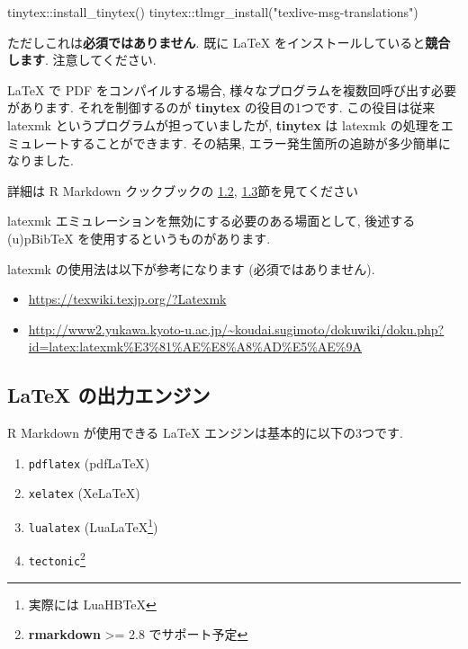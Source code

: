 \documentclass[
]{ltjsarticle}
\newenvironment{Shaded}{\begin{snugshade}}{\end{snugshade}}
\newcommand{\FunctionTok}[1]{\textcolor[rgb]{0.00,0.00,0.00}{#1}}
\newcommand{\NormalTok}[1]{#1}
\newcommand{\SpecialCharTok}[1]{\textcolor[rgb]{0.00,0.00,0.00}{#1}}
\newcommand{\StringTok}[1]{\textcolor[rgb]{0.31,0.60,0.02}{#1}}
\providecommand{\tightlist}{%
  \setlength{\itemsep}{0pt}\setlength{\parskip}{0pt}}
\begin{document}
\begin{Shaded}
\begin{Highlighting}[numbers=left,,]
\NormalTok{tinytex}\SpecialCharTok{::}\FunctionTok{install\_tinytex}\NormalTok{()}
\NormalTok{tinytex}\SpecialCharTok{::}\FunctionTok{tlmgr\_install}\NormalTok{(}\StringTok{"texlive{-}msg{-}translations"}\NormalTok{)}
\end{Highlighting}
\end{Shaded}

ただしこれは\textbf{必須ではありません}. 既に LaTeX をインストールしていると\textbf{競合します}. 注意してください.

LaTeX で PDF をコンパイルする場合, 様々なプログラムを複数回呼び出す必要があります. それを制御するのが \textbf{tinytex} の役目の1つです. この役目は従来 latexmk というプログラムが担っていましたが, \textbf{tinytex} は latexmk の処理をエミュレートすることができます. その結果, エラー発生箇所の追跡が多少簡単になりました.

詳細は R Markdown クックブックの \href{https://gedevan-aleksizde.github.io/rmarkdown-cookbook/install-latex.html}{1.2}, \href{https://gedevan-aleksizde.github.io/rmarkdown-cookbook/install-latex-pkgs.html}{1.3}節を見てください

latexmk エミュレーションを無効にする必要のある場面として, 後述する (u)pBibTeX を使用するというものがあります.

latexmk の使用法は以下が参考になります (必須ではありません).

\begin{itemize}
\tightlist
\item
  \url{https://texwiki.texjp.org/?Latexmk}
\item
  \url{http://www2.yukawa.kyoto-u.ac.jp/~koudai.sugimoto/dokuwiki/doku.php?id=latex:latexmk\%E3\%81\%AE\%E8\%A8\%AD\%E5\%AE\%9A}
\end{itemize}

\hypertarget{latex-ux306eux51faux529bux30a8ux30f3ux30b8ux30f3}{%
\subsection{LaTeX の出力エンジン}\label{latex-ux306eux51faux529bux30a8ux30f3ux30b8ux30f3}}

R Markdown が使用できる LaTeX エンジンは基本的に以下の3つです.

\begin{enumerate}
\def\labelenumi{\arabic{enumi}.}
\tightlist
\item
  \texttt{pdflatex} (pdfLaTeX)
\item
  \texttt{xelatex} (XeLaTeX)
\item
  \texttt{lualatex} (LuaLaTeX\footnote{実際には LuaHBTeX})
\item
  \texttt{tectonic}\footnote{\textbf{rmarkdown} \textgreater= 2.8 でサポート予定}
\end{enumerate}
\end{document}
